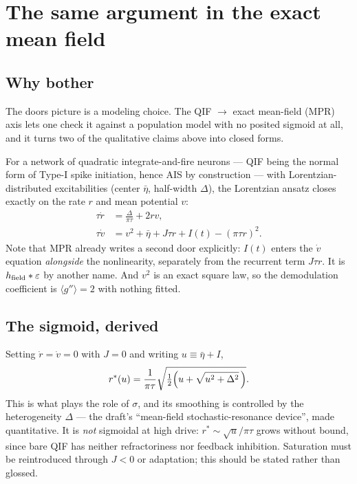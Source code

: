 \documentclass[11pt,a4paper]{article}
\begin{document}
\section{The same argument in the exact mean field}

\subsection{Why bother}
The doors picture is a modeling choice. The QIF $\rightarrow$ exact mean-field (MPR) axis lets one check
it against a population model with no posited sigmoid at all, and it turns two of the qualitative claims
above into closed forms.

For a network of quadratic integrate-and-fire neurons --- QIF being the normal form of Type-I spike
initiation, hence AIS by construction --- with Lorentzian-distributed excitabilities (center
$\bar\eta$, half-width $\Delta$), the Lorentzian ansatz closes exactly on the rate $r$ and mean
potential $v$:
\begin{align}
\tau\dot r &= \frac{\Delta}{\pi\tau} + 2rv, \label{eq:mpr1}\\
\tau\dot v &= v^2 + \bar\eta + J\tau r + I(t) - (\pi\tau r)^2. \label{eq:mpr2}
\end{align}
Note that MPR already writes a second door explicitly: $I(t)$ enters the $\dot v$ equation
\emph{alongside} the nonlinearity, separately from the recurrent term $J\tau r$. It is
$h_{\rm field}*\varepsilon$ by another name. And $v^2$ is an exact square law, so the demodulation
coefficient is $\langle g''\rangle=2$ with nothing fitted.

\subsection{The sigmoid, derived}
Setting $\dot r=\dot v=0$ with $J=0$ and writing $u\equiv\bar\eta+I$,
\begin{equation}
r^*(u)=\frac{1}{\pi\tau}\sqrt{\tfrac12\Bigl(u+\sqrt{u^2+\Delta^2}\,\Bigr)}.
\label{eq:fI}
\end{equation}
This is what plays the role of $\sigma$, and its smoothing is controlled by the heterogeneity $\Delta$
--- the draft's ``mean-field stochastic-resonance device'', made quantitative. It is \emph{not}
sigmoidal at high drive: $r^*\sim\sqrt u/\pi\tau$ grows without bound, since bare QIF has neither
refractoriness nor feedback inhibition. Saturation must be reintroduced through $J<0$ or adaptation;
this should be stated rather than glossed.
\end{document}
